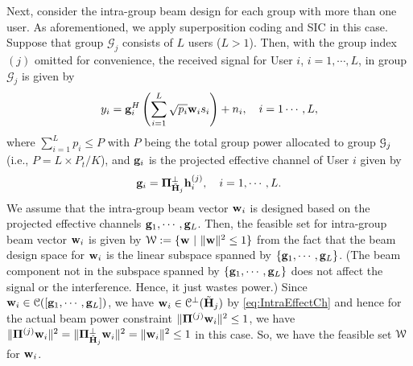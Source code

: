 \documentclass[11pt, draft, onecolumn ]{IEEEtran}
\begin{document}
Next, consider the intra-group beam design for each group with more than one user. As aforementioned, we apply
 superposition
coding and SIC in this case. Suppose that group $\mathcal{G}_j$ consists of $L$ users ($L > 1$). Then, with the group  index $(j)$ omitted for convenience, the received signal for User $i$, $i=1,\cdots,L$,  in group $\mathcal{G}_j$ is given by
\begin{equation} \label{eq:BC_l}
    y_i = {\bf g}_i^H \left(\sum_{i =1}^L\sqrt{p_i} \mathbf{w}_i
    s_i\right) + n_i, \quad i = 1 \cdots, L ,
\end{equation}
where $\sum_{i=1}^L p_i \le  P$ with $P$ being the total group power allocated to  group ${\cal G}_j$ (i.e., $P = L \times P_t/K$), and
${\bf g}_i$ is the projected effective channel of User $i$ given by
\begin{equation}  \label{eq:IntraEffectCh}
    {\bf g}_i = {\bf \Pi}_{\tilde{{\bf H}}_j}^\bot {\bf h}_i^{(j)}, \quad i = 1, \cdots, L.
\end{equation}
We assume that the intra-group beam vector ${\bf w}_i$ is designed based on the projected effective channels ${\bf g}_1,\cdots,{\bf g}_L$.
Then, the feasible set for intra-group beam vector ${\bf w}_i$ is given by $\mathcal{W} := \{ {\bf w} ~|~ \| {\bf w}\|^2 \leq 1\}$ from the
fact that the beam design space for ${\bf w}_i$ is the linear subspace spanned by $\{{\bf g}_1, \cdots, {\bf g}_L\}$. (The beam component not in the subspace spanned by   $\{{\bf g}_1, \cdots, {\bf g}_L\}$ does not affect the signal or the interference. Hence, it just wastes power.) Since ${\bf w}_i \in {\cal C}([{\bf g}_1,\cdots,{\bf g}_L])$, we have ${\bf w}_i \in {\cal C}^\perp(\tilde{{\bf H}}_j)$ by \eqref{eq:IntraEffectCh} and hence for the actual beam power constraint $\|{\bf \Pi}^{(j)} {\bf w}_i \|^2 \le 1$, we have
$\|{\bf \Pi}^{(j)} {\bf w}_i \|^2=\|  {\bf \Pi}_{\tilde{{\bf H}}_j}^\bot {\bf w}_i\|^2 =\|{\bf w}_i\|^2 \le 1$ in this case. So, we have the feasible set ${\cal W}$ for ${\bf w}_i$.
\end{document}
